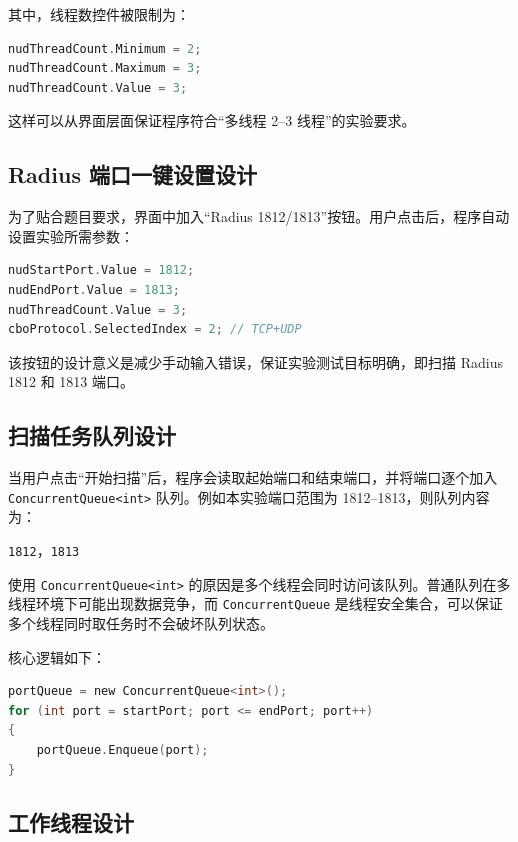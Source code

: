 \documentclass[UTF8,a4paper,12pt]{ctexart}
\begin{document}
其中，线程数控件被限制为：

\begin{lstlisting}[language=C]
nudThreadCount.Minimum = 2;
nudThreadCount.Maximum = 3;
nudThreadCount.Value = 3;
\end{lstlisting}

这样可以从界面层面保证程序符合“多线程 2--3 线程”的实验要求。

\subsection{Radius 端口一键设置设计}

为了贴合题目要求，界面中加入“Radius 1812/1813”按钮。用户点击后，程序自动设置实验所需参数：

\begin{lstlisting}[language=C]
nudStartPort.Value = 1812;
nudEndPort.Value = 1813;
nudThreadCount.Value = 3;
cboProtocol.SelectedIndex = 2; // TCP+UDP
\end{lstlisting}

该按钮的设计意义是减少手动输入错误，保证实验测试目标明确，即扫描 Radius 1812 和 1813 端口。

\subsection{扫描任务队列设计}

当用户点击“开始扫描”后，程序会读取起始端口和结束端口，并将端口逐个加入 \texttt{ConcurrentQueue<int>} 队列。例如本实验端口范围为 1812--1813，则队列内容为：

\begin{center}
\texttt{1812}，\texttt{1813}
\end{center}

使用 \texttt{ConcurrentQueue<int>} 的原因是多个线程会同时访问该队列。普通队列在多线程环境下可能出现数据竞争，而 \texttt{ConcurrentQueue} 是线程安全集合，可以保证多个线程同时取任务时不会破坏队列状态。

核心逻辑如下：

\begin{lstlisting}[language=C]
portQueue = new ConcurrentQueue<int>();
for (int port = startPort; port <= endPort; port++)
{
    portQueue.Enqueue(port);
}
\end{lstlisting}

\subsection{工作线程设计}
\end{document}
